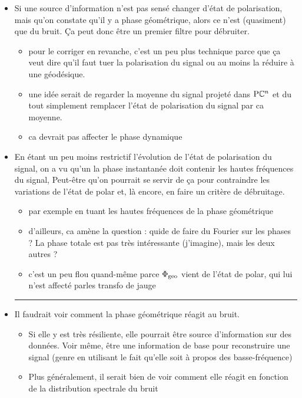 \begin{itemize}
	\item Si une source d'information n'est pas sensé changer d'état de polarisation, mais qu'on constate qu'il y a phase géométrique, alors ce n'est (quasiment) que du bruit. Ça peut donc être un premier filtre pour débruiter.
	\begin{itemize}
		
		\item pour le corriger en revanche, c'est un peu plus technique parce que ça veut dire qu'il faut tuer la polarisation du signal ou au moins la réduire à une géodésique.
		
		\item une idée serait de regarder la moyenne du signal projeté dans $\text{\normalfont P}\mathbb{C}^{n}$ et du tout simplement remplacer l'état de polarisation du signal par ca moyenne. 
		
		\item ca devrait pas affecter le phase dynamique	
	\end{itemize}
	
	\item En étant un peu moins restrictif l'évolution de l'état de polarisation du signal, on a vu qu'un la phase instantanée doit contenir les hautes fréquences du signal, Peut-être qu'on pourrait se servir de ça pour contraindre les variations de l'état de polar et, là encore, en faire un critère de débruitage.
	\begin{itemize}
		
		\item  par exemple en tuant les hautes fréquences de la phase géométrique
		
		\item d'ailleurs, ca amène la question : quide de faire du Fourier sur les phases ? La phase totale est pas très intéressante (j'imagine), mais les deux autres ? 
		
		\item c'est un peu flou quand-même parce $\Phi_{\text{\normalfont geo}}$ vient de l'état de polar, qui lui n'est affecté parles transfo de jauge
	\end{itemize}
	
	\hrule

	\item Il faudrait voir comment la phase géométrique réagit au bruit.
	\begin{itemize}
		
		\item Si elle y est très résiliente, elle pourrait être source d'information sur des données. Voir même, être une information de base pour reconstruire une signal (genre en utilisant le fait qu'elle soit à propos des basse-fréquence)
		
		\item Plus généralement, il serait bien de voir comment elle réagit en fonction de la distribution spectrale du bruit
	\end{itemize}
	
\end{itemize}



